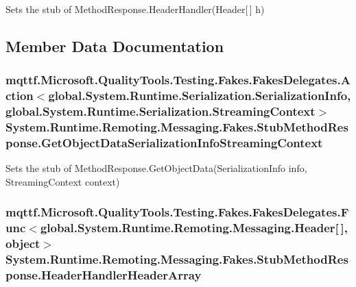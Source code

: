 Sets the stub of Method\-Response.\-Header\-Handler(\-Header\mbox{[}$\,$\mbox{]} h)



\subsection{Member Data Documentation}
\hypertarget{class_system_1_1_runtime_1_1_remoting_1_1_messaging_1_1_fakes_1_1_stub_method_response_a14f547cc9e513a4b1625384aa58e2e47}{
\subsubsection[{Get\-Object\-Data\-Serialization\-Info\-Streaming\-Context}]{\setlength{\rightskip}{0pt plus 5cm}mqttf.\-Microsoft.\-Quality\-Tools.\-Testing.\-Fakes.\-Fakes\-Delegates.\-Action$<$global.\-System.\-Runtime.\-Serialization.\-Serialization\-Info, global.\-System.\-Runtime.\-Serialization.\-Streaming\-Context$>$ System.\-Runtime.\-Remoting.\-Messaging.\-Fakes.\-Stub\-Method\-Response.\-Get\-Object\-Data\-Serialization\-Info\-Streaming\-Context}}\label{class_system_1_1_runtime_1_1_remoting_1_1_messaging_1_1_fakes_1_1_stub_method_response_a14f547cc9e513a4b1625384aa58e2e47}


Sets the stub of Method\-Response.\-Get\-Object\-Data(\-Serialization\-Info info, Streaming\-Context context)

\hypertarget{class_system_1_1_runtime_1_1_remoting_1_1_messaging_1_1_fakes_1_1_stub_method_response_a0bbde81d5f0f9f5fcaea087374c858b0}{
\subsubsection[{Header\-Handler\-Header\-Array}]{\setlength{\rightskip}{0pt plus 5cm}mqttf.\-Microsoft.\-Quality\-Tools.\-Testing.\-Fakes.\-Fakes\-Delegates.\-Func$<$global.\-System.\-Runtime.\-Remoting.\-Messaging.\-Header\mbox{[}$\,$\mbox{]}, object$>$ System.\-Runtime.\-Remoting.\-Messaging.\-Fakes.\-Stub\-Method\-Response.\-Header\-Handler\-Header\-Array}}\label{class_system_1_1_runtime_1_1_remoting_1_1_messaging_1_1_fakes_1_1_stub_method_response_a0bbde81d5f0f9f5fcaea087374c858b0}


